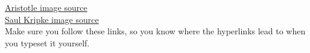 \documentclass[]{article}
\theoremstyle{remark}
\begin{document}
\begin{figure}[H]
    \centering
    \begin{floatrow}
    \end{floatrow}
\end{figure}

\href{https://www.britannica.com/biography/Aristotle#/media/1/34560/76426}{Aristotle image source} \\
\href{https://commons.wikimedia.org/w/index.php?curid=5763037}{Saul Kripke image source} \\
Make sure you follow these links, so you know where the hyperlinks lead to when you typeset it yourself.
\end{document}
